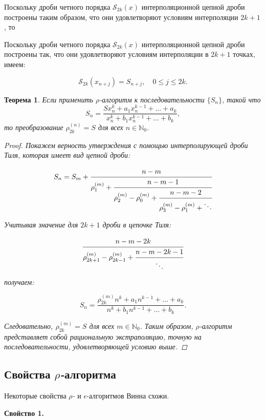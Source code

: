 \documentclass[14pt, a4paper]{extarticle}
\newtheorem{theorem}{Теорема}[section] %
\theoremstyle{definition}
\theoremstyle{remark}
\begin{document}
Поскольку дроби четного порядка \(\mathcal{S}_{2k}(x)\) интерполяционной цепной дроби построены таким образом, что они удовлетворяют условиям
интерполяции \(2k + 1\), то

Поскольку дроби четного порядка \(\mathcal{S}_{2k}(x)\) интерполяционной цепной дроби построены так, что они удовлетворяют условиям интерполяции в \(2k + 1\) точках, имеем:

\[
\mathcal{S}_{2k}\left(x_{n+j}\right) = S_{n+j}, \quad 0 \leq j \leq 2k. 
\]


\begin{theorem}
Если применить \emph{$\rho$}-алгоритм к последовательности \(\{S_n\}\), такой что
\[
S_n = \frac{S x_n^k + a_1 x_n^{k-1} + \dots + a_k}{x_n^k + b_1 x_n^{k-1} + \dots + b_k},
\]
то преобразование \(\rho_{2k}^{(n)} = S\) для всех \(n \in \mathbb{N}_0\).

\begin{proof}
Покажем верность утверждения с помощью интерполирующей дроби Тиля, которая имеет вид цепной дроби:

\[
S_n = S_m + \cfrac{n-m}{\rho_1^{(m)} + \cfrac{n-m-1}{\rho_2^{(m)} - \rho_0^{(m)} + \cfrac{n-m-2}{\rho_3^{(m)} - \rho_1^{(m)} + \ddots}}}
\]

Учитывая значение для \(2k+1\) дроби в цепочке Тиля:

\[
\cfrac{n-m-2k}{\rho_{2k+1}^{(m)} - \rho_{2k-1}^{(m)} + \cfrac{n-m-2k-1}{\ddots}}
\]

получаем:

\[
S_n = \frac{\rho_{2k}^{(m)} n^k + a_1 n^{k-1} + \dots + a_k}{n^k + b_1 n^{k-1} + \dots + b_k}.
\]

Следовательно, \(\rho_{2k}^{(m)} = S\) для всех \(m \in \mathbb{N}_0\). Таким образом, \(\rho\)-алгоритм представляет собой рациональную экстраполяцию, точную на последовательности, удовлетворяющей условию выше.
\end{proof}
\end{theorem}

\subsection*{Свойства \emph{$\rho$-}алгоритма}

Некоторые свойства \emph{$\rho$-} и \(\epsilon\)-алгоритмов Винна схожи.

\textbf{Свойство 1.}  
\end{document}
